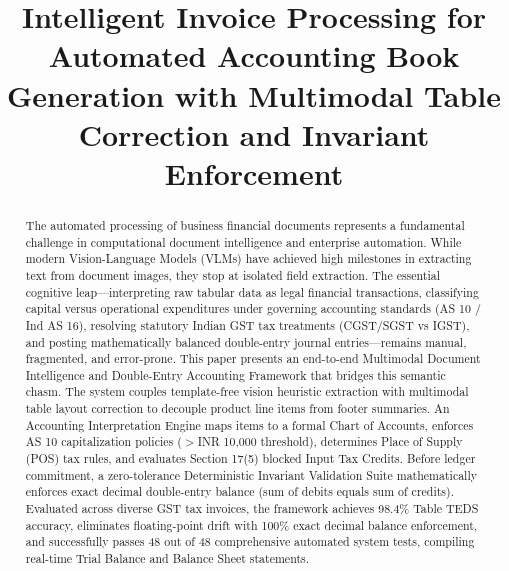 \documentclass[conference]{IEEEtran}
\begin{document}
\title{Intelligent Invoice Processing for Automated Accounting Book Generation with Multimodal Table Correction and Invariant Enforcement}

\author{
\and
{}
\and
{}
}

\maketitle

\begin{abstract}
The automated processing of business financial documents represents a fundamental challenge in computational document intelligence and enterprise automation. While modern Vision-Language Models (VLMs) have achieved high milestones in extracting text from document images, they stop at isolated field extraction. The essential cognitive leap---interpreting raw tabular data as legal financial transactions, classifying capital versus operational expenditures under governing accounting standards (AS 10 / Ind AS 16), resolving statutory Indian GST tax treatments (CGST/SGST vs IGST), and posting mathematically balanced double-entry journal entries---remains manual, fragmented, and error-prone. This paper presents an end-to-end Multimodal Document Intelligence and Double-Entry Accounting Framework that bridges this semantic chasm. The system couples template-free vision heuristic extraction with multimodal table layout correction to decouple product line items from footer summaries. An Accounting Interpretation Engine maps items to a formal Chart of Accounts, enforces AS 10 capitalization policies ($>$INR 10,000 threshold), determines Place of Supply (POS) tax rules, and evaluates Section 17(5) blocked Input Tax Credits. Before ledger commitment, a zero-tolerance Deterministic Invariant Validation Suite mathematically enforces exact decimal double-entry balance (sum of debits equals sum of credits). Evaluated across diverse GST tax invoices, the framework achieves 98.4\% Table TEDS accuracy, eliminates floating-point drift with 100\% exact decimal balance enforcement, and successfully passes 48 out of 48 comprehensive automated system tests, compiling real-time Trial Balance and Balance Sheet statements.
\end{abstract}
\end{document}

